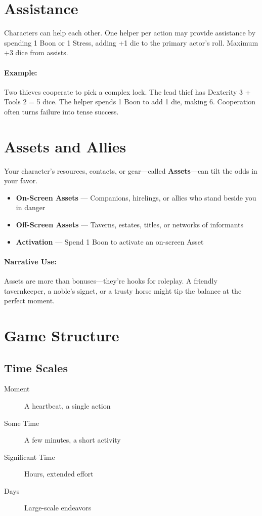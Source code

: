 \section{Assistance} 

Characters can help each other. One helper per action may provide assistance by spending 1 Boon or 1 Stress, adding +1 die to the primary actor's roll. Maximum +3 dice from assists.

\paragraph{Example:}  
Two thieves cooperate to pick a complex lock. The lead thief has Dexterity 3 + Tools 2 = 5 dice. The helper spends 1 Boon to add 1 die, making 6. Cooperation often turns failure into tense success.

\section{Assets and Allies} 

Your character's resources, contacts, or gear—called \textbf{Assets}—can tilt the odds in your favor.

\begin{itemize}
  \item \textbf{On-Screen Assets} — Companions, hirelings, or allies who stand beside you in danger
  \item \textbf{Off-Screen Assets} — Taverns, estates, titles, or networks of informants
  \item \textbf{Activation} — Spend 1 Boon to activate an on-screen Asset
\end{itemize}

\paragraph{Narrative Use:}  
Assets are more than bonuses—they're hooks for roleplay. A friendly tavernkeeper, a noble's signet, or a trusty horse might tip the balance at the perfect moment.

\section{Game Structure} 

\subsection*{Time Scales}
\begin{description}
  \item[Moment] A heartbeat, a single action
  \item[Some Time] A few minutes, a short activity
  \item[Significant Time] Hours, extended effort
  \item[Days] Large-scale endeavors
\end{description}

